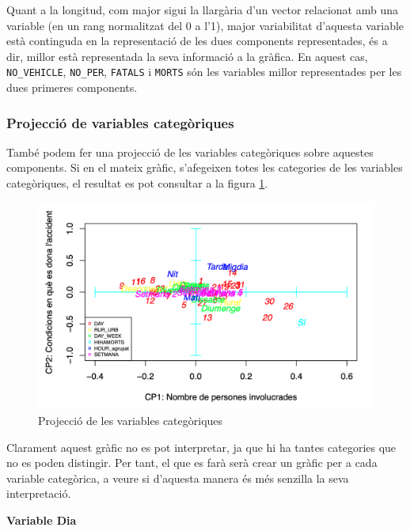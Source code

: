 \documentclass[12pt,longbibliography]{article}
\theoremstyle{definition}
\theoremstyle{remark}
\begin{document}
Quant a la longitud, com major sigui la llargària d'un vector relacionat amb una variable (en un rang normalitzat del 0 a l'1), major variabilitat d'aquesta variable està continguda en la representació de les dues components representades, és a dir, millor està representada la seva informació a la gràfica. En aquest cas, \texttt{NO\_VEHICLE}, \texttt{NO\_PER}, \texttt{FATALS} i \texttt{MORTS} són les variables millor representades per les dues primeres components.


\subsubsection{Projecció de variables categòriques}


També podem fer una projecció de les variables categòriques sobre aquestes components. Si en el mateix gràfic, s'afegeixen totes les categories de les variables categòriques, el resultat es pot consultar a la figura \ref{fig:ACP6}.

\begin{figure}[H]
\begin{center}
\includegraphics[width=12cm]{acp6}
\end{center}
\caption{Projecció de les variables categòriques}
\label{fig:ACP6}
\end{figure}


Clarament aquest gràfic no es pot interpretar, ja que hi ha tantes categories que no es poden distingir.
Per tant, el que es farà serà crear un gràfic per a cada variable categòrica, a veure si d'aquesta manera és més senzilla la seva interpretació.



\textbf{Variable Dia}
\end{document}
